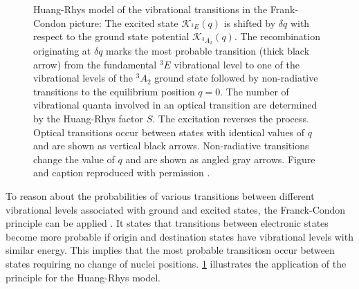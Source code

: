    \begin{figure}[htbp]
     \centering
     \caption[Huang-Rhys model of vibrational transitions]{Huang-Rhys model of the vibrational transitions in the Frank-Condon picture: The excited state $\mathcal{K}_{{}^{3}E}(q)$ is shifted by $\delta q$ with respect to the ground state potential $\mathcal{K}_{{}^{3}A_{2}}(q)$. The recombination originating at $\delta q$ marks the most probable transition (thick black arrow) from the fundamental ${}^{3}E$ vibrational level to one of the vibrational levels of the ${}^{3}A_{2}$ ground state followed by non-radiative transitions to the equilibrium position $q = 0$. The number of vibrational quanta involved in an optical transition are determined by the Huang-Rhys factor $S$. The excitation reverses the process. Optical transitions occur between states with identical values of $q$ and are shown as vertical black arrows. Non-radiative transitions change the value of $q$ and are shown as angled gray arrows. Figure and caption reproduced with permission \cite{janine::thesis}.}
     \label{fig::huang_rhys_model}
   \end{figure}

   To reason about the probabilities of various transitions between different vibrational levels associated with ground and excited states, the Franck-Condon principle can be applied \cite{J.Franck: Elementary processes of photochemical reactions, E. U. Condon: A Theory of Intensity Distribution in Band Systems}. It states that transitions between electronic states become more probable if origin and destination states have vibrational levels with similar energy. This implies that the most probable transitiosn occur between states requiring no change of nuclei positions. \cref{fig::huang_rhys_model} illustrates the application of the principle for the Huang-Rhys model.

